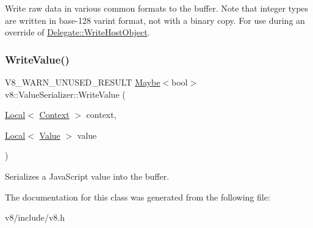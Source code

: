 Write raw data in various common formats to the buffer. Note that integer types are written in base-\/128 varint format, not with a binary copy. For use during an override of \mbox{\hyperlink{classv8_1_1ValueSerializer_1_1Delegate_ae97808060b22d7a94517f725922b72c6}{Delegate\+::\+Write\+Host\+Object}}. \mbox{\label{classv8_1_1ValueSerializer_a32b08083cb7d83bf3b117b61f327ea23}} 
\subsubsection{\texorpdfstring{Write\+Value()}{WriteValue()}}
{\footnotesize\ttfamily V8\+\_\+\+W\+A\+R\+N\+\_\+\+U\+N\+U\+S\+E\+D\+\_\+\+R\+E\+S\+U\+LT \mbox{\hyperlink{classv8_1_1Maybe}{Maybe}}$<$bool$>$ v8\+::\+Value\+Serializer\+::\+Write\+Value (\begin{DoxyParamCaption}\item[{\mbox{\hyperlink{classv8_1_1Local}{Local}}$<$ \mbox{\hyperlink{classv8_1_1Context}{Context}} $>$}]{context,  }\item[{\mbox{\hyperlink{classv8_1_1Local}{Local}}$<$ \mbox{\hyperlink{classv8_1_1Value}{Value}} $>$}]{value }\end{DoxyParamCaption})}

Serializes a Java\+Script value into the buffer. 

The documentation for this class was generated from the following file\+:\begin{DoxyCompactItemize}
\item 
v8/include/v8.\+h\end{DoxyCompactItemize}
